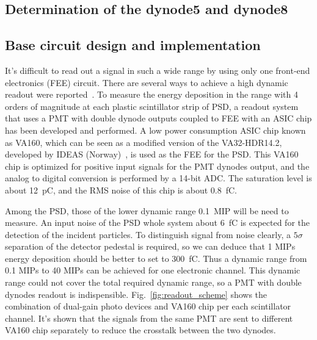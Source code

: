 \documentclass[5p, times]{elsarticle}
\begin{document}
\subsection{Determination of the dynode5 and dynode8}

\subsection{Base circuit design and implementation}

It's difficult to read out a signal in such a wide range by using only one front-end electronics (FEE) circuit. 
There are several ways to achieve a high dynamic readout were reported~\cite{katayose2008development,kampert1994high,zhang2012high}. 
To measure the energy deposition in the range with 4 orders of magnitude at each plastic scintillator strip of PSD, a readout system that uses a PMT with double dynode outputs coupled to FEE with an ASIC chip has been developed and performed. 
A low power consumption ASIC chip known as VA160, which can be seen as a modified version of the VA32-HDR14.2, developed by IDEAS (Norway)~\cite{va160}, is used as the FEE for the PSD. 
This VA160 chip is optimized for positive input signals for the PMT dynodes output, and the analog to digital conversion is performed by a 14-bit ADC. 
The saturation level is about \SI{12}{\pico\coulomb}, and the RMS noise of this chip is about \SI{0.8}{\femto\coulomb}.

Among the PSD, those of the lower dynamic range \SI{0.1}{MIP} will be need to measure. 
An input noise of the PSD whole system about \SI{6}{\femto\coulomb} is expected for the detection of the incident particles. 
To distinguish signal from noise clearly, a $5\sigma$ separation of the detector pedestal is required, so we can deduce that 1 MIPs energy deposition should be better to set to \SI{300}{\femto\coulomb}. 
Thus a dynamic range from 0.1 MIPs to 40 MIPs can be achieved for one electronic channel.
This dynamic range could not cover the total required dynamic range, so a PMT with double dynodes readout is indispensible. 
Fig.~\ref{fig:readout_scheme} shows the combination of dual-gain photo devices and VA160 chip per each scintillator channel.
It’s shown that the signals from the same PMT are sent to different VA160 chip separately to reduce the crosstalk between the two dynodes.
\end{document}
